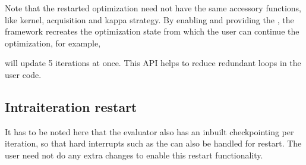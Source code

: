 \documentclass[letterpaper,12pt,english]{sphinxmanual}
\begin{document}
\begin{sphinxVerbatim}[commandchars=\\\{\}]
  
                          
                         
\end{sphinxVerbatim}

\sphinxAtStartPar
Note that the restarted optimization need not have the same accessory functions, like kernel, acquisition and kappa
strategy. By enabling  and providing the , the framework re\sphinxhyphen{}creates the optimization
state from which the user can continue the optimization, for example,

\begin{sphinxVerbatim}[commandchars=\\\{\}]
\end{sphinxVerbatim}

\sphinxAtStartPar
will update 5 iterations at once. This API helps to reduce redundant loops in the user code.


\subsection{Intra\sphinxhyphen{}iteration restart}
\label{\detokenize{examples/restart_example:intra-iteration-restart}}
\sphinxAtStartPar
It has to be noted here that the evaluator also has an inbuilt check\sphinxhyphen{}pointing per iteration, so that hard interrupts
such as the  can also be handled for restart. The user need not do any extra changes to enable
this  restart functionality.
\end{document}
